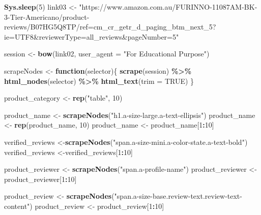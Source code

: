 \documentclass[
]{article}
\newenvironment{Shaded}{\begin{snugshade}}{\end{snugshade}}
\newcommand{\AttributeTok}[1]{\textcolor[rgb]{0.13,0.29,0.53}{#1}}
\newcommand{\ConstantTok}[1]{\textcolor[rgb]{0.56,0.35,0.01}{#1}}
\newcommand{\ControlFlowTok}[1]{\textcolor[rgb]{0.13,0.29,0.53}{\textbf{#1}}}
\newcommand{\DecValTok}[1]{\textcolor[rgb]{0.00,0.00,0.81}{#1}}
\newcommand{\FunctionTok}[1]{\textcolor[rgb]{0.13,0.29,0.53}{\textbf{#1}}}
\newcommand{\NormalTok}[1]{#1}
\newcommand{\OtherTok}[1]{\textcolor[rgb]{0.56,0.35,0.01}{#1}}
\newcommand{\SpecialCharTok}[1]{\textcolor[rgb]{0.81,0.36,0.00}{\textbf{#1}}}
\newcommand{\StringTok}[1]{\textcolor[rgb]{0.31,0.60,0.02}{#1}}
\begin{document}
\begin{Shaded}
\begin{Highlighting}[]
   \FunctionTok{Sys.sleep}\NormalTok{(}\DecValTok{5}\NormalTok{)}
\NormalTok{link03 }\OtherTok{\textless{}{-}} \StringTok{"https://www.amazon.com.au/FURINNO{-}11087AM{-}BK{-}3{-}Tier{-}Americano/product{-}reviews/B07HG5Q8TP/ref=cm\_cr\_getr\_d\_paging\_btm\_next\_5?ie=UTF8\&reviewerType=all\_reviews\&pageNumber=5"}


\NormalTok{  session }\OtherTok{\textless{}{-}} \FunctionTok{bow}\NormalTok{(link02,}
               \AttributeTok{user\_agent =} \StringTok{"For Educational Purpose"}\NormalTok{)}

\NormalTok{  scrapeNodes }\OtherTok{\textless{}{-}} \ControlFlowTok{function}\NormalTok{(selector)\{}
    \FunctionTok{scrape}\NormalTok{(session) }\SpecialCharTok{\%\textgreater{}\%}
      \FunctionTok{html\_nodes}\NormalTok{(selector) }\SpecialCharTok{\%\textgreater{}\%}
      \FunctionTok{html\_text}\NormalTok{(}\AttributeTok{trim =} \ConstantTok{TRUE}\NormalTok{)}
\NormalTok{  \}}

\NormalTok{  product\_category }\OtherTok{\textless{}{-}} \FunctionTok{rep}\NormalTok{(}\StringTok{"table"}\NormalTok{, }\DecValTok{10}\NormalTok{)}

\NormalTok{  product\_name }\OtherTok{\textless{}{-}} \FunctionTok{scrapeNodes}\NormalTok{(}\StringTok{"h1.a{-}size{-}large.a{-}text{-}ellipsis"}\NormalTok{)}
\NormalTok{  product\_name }\OtherTok{\textless{}{-}} \FunctionTok{rep}\NormalTok{(product\_name, }\DecValTok{10}\NormalTok{)}
\NormalTok{  product\_name }\OtherTok{\textless{}{-}}\NormalTok{ product\_name[}\DecValTok{1}\SpecialCharTok{:}\DecValTok{10}\NormalTok{]}
  
\NormalTok{  verified\_reviews }\OtherTok{\textless{}{-}}\FunctionTok{scrapeNodes}\NormalTok{(}\StringTok{"span.a{-}size{-}mini.a{-}color{-}state.a{-}text{-}bold"}\NormalTok{)}
\NormalTok{  verified\_reviews }\OtherTok{\textless{}{-}}\NormalTok{verified\_reviews[}\DecValTok{1}\SpecialCharTok{:}\DecValTok{10}\NormalTok{]}
  
\NormalTok{  product\_reviewer }\OtherTok{\textless{}{-}} \FunctionTok{scrapeNodes}\NormalTok{(}\StringTok{"span.a{-}profile{-}name"}\NormalTok{)}
\NormalTok{  product\_reviewer }\OtherTok{\textless{}{-}}\NormalTok{ product\_reviewer[}\DecValTok{1}\SpecialCharTok{:}\DecValTok{10}\NormalTok{]}
  
\NormalTok{  product\_review }\OtherTok{\textless{}{-}} \FunctionTok{scrapeNodes}\NormalTok{(}\StringTok{"span.a{-}size{-}base.review{-}text.review{-}text{-}content"}\NormalTok{)}
\NormalTok{  product\_review }\OtherTok{\textless{}{-}}\NormalTok{ product\_review[}\DecValTok{1}\SpecialCharTok{:}\DecValTok{10}\NormalTok{]}
  

\end{Highlighting}
\end{Shaded}
\end{document}
